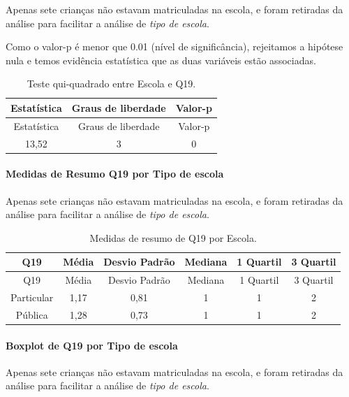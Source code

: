 \documentclass[]{article}
\let\oldparagraph\paragraph
\renewcommand{\paragraph}[1]{\oldparagraph{#1}\mbox{}}
\begin{document}
Apenas sete crianças não estavam matriculadas na escola, e foram retiradas da análise para facilitar a análise de \emph{tipo de escola}.

Como o valor-p é menor que 0.01 (nível de significância), rejeitamos a hipótese nula e temos evidência estatística que as duas variáveis estão associadas.

\begin{longtable}[]{@{}ccc@{}}
\caption{\label{tab:unnamed-chunk-350}Teste qui-quadrado entre Escola e Q19.}\tabularnewline
\toprule
Estatística & Graus de liberdade & Valor-p\tabularnewline
\midrule
\endfirsthead
\toprule
Estatística & Graus de liberdade & Valor-p\tabularnewline
\midrule
\endhead
13,52 & 3 & 0\tabularnewline
\bottomrule
\end{longtable}

\cleardoublepage

\hypertarget{medidas-de-resumo-q19-por-tipo-de-escola}{%
\paragraph{Medidas de Resumo Q19 por Tipo de escola}\label{medidas-de-resumo-q19-por-tipo-de-escola}}

Apenas sete crianças não estavam matriculadas na escola, e foram retiradas da análise para facilitar a análise de \emph{tipo de escola}.

\begin{longtable}[]{@{}cccccc@{}}
\caption{\label{tab:unnamed-chunk-351}Medidas de resumo de Q19 por Escola.}\tabularnewline
\toprule
Q19 & Média & Desvio Padrão & Mediana & 1 Quartil & 3 Quartil\tabularnewline
\midrule
\endfirsthead
\toprule
Q19 & Média & Desvio Padrão & Mediana & 1 Quartil & 3 Quartil\tabularnewline
\midrule
\endhead
Particular & 1,17 & 0,81 & 1 & 1 & 2\tabularnewline
Pública & 1,28 & 0,73 & 1 & 1 & 2\tabularnewline
\bottomrule
\end{longtable}

\hypertarget{boxplot-de-q19-por-tipo-de-escola}{%
\paragraph{Boxplot de Q19 por Tipo de escola}\label{boxplot-de-q19-por-tipo-de-escola}}

Apenas sete crianças não estavam matriculadas na escola, e foram retiradas da análise para facilitar a análise de \emph{tipo de escola}.
\end{document}

